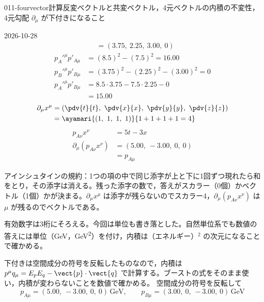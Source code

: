\documentclass[uplatex,dvipdfmx,a4paper,11pt]{jsarticle}
\begin{document}
\begin{mondai}{011-fourvector}{計算}{反変ベクトルと共変ベクトル，4元ベクトルの内積の不変性，4元勾配 $\partial_\mu$ が下付きになること}
\begin{kotaeutsushi}{2026-10-28}
\begin{align*}
  &=(3.75,\ 2.25,\ 3.00,\ 0)
\end{align*}
\begin{align*}
  p_{A}'^{\mu}p'_{A\mu}&=(8.5)^{2}-(7.5)^{2}=16.00\\
  p_{B}'^{\mu}p'_{B\mu}&=(3.75)^{2}-(2.25)^{2}-(3.00)^{2}=0\\
  p_{A}'^{\mu}p'_{B\mu}&=8.5\cdot3.75-7.5\cdot2.25-0\\
  &=15.00
\end{align*}
\begin{align*}
  \partial_{\mu}x^{\mu}&=\left(\pdv{t}{t},\ \pdv{x}{x},\ \pdv{y}{y},\ \pdv{z}{z}\right)\\
  &=\ayamari{(1,\ 1,\ 1,\ 1)}{1+1+1+1=4}
\end{align*}
\begin{align*}
  p_{A\nu}x^{\nu}&=5t-3x\\
  \partial_{\mu}(p_{A\nu}x^{\nu})&=(5.00,\ -3.00,\ 0,\ 0)\\
  &=p_{A\mu}
\end{align*}
\end{kotaeutsushi}
\begin{kizuki}
\item アインシュタインの規約：1つの項の中で同じ添字が上と下に1回ずつ現れたら和をとり，その添字は消える。残った添字の数で，答えがスカラー（0個）かベクトル（1個）かが決まる。$\partial_{\mu}x^{\mu}$ は添字が残らないのでスカラー4，$\partial_{\mu}(p_{A\nu}x^{\nu})$ は $\mu$ が残るのでベクトルである。
\item {} 有効数字は3桁にそろえる。今回は単位も書き落とした。自然単位系でも数値の答えには単位（\unit{\giga\electronvolt}，\unit{\giga\electronvolt\squared}）を付け，内積は（エネルギー）$^{2}$ の次元になることで確かめる。
\end{kizuki}
\begin{tadashii}
\houshin 下付きは空間成分の符号を反転したものなので，内積は $p^\mu q_\mu=E_pE_q-\vect{p}\cdot\vect{q}$ で計算する。ブーストの式をそのまま使い，内積が変わらないことを数値で確かめる。 %
\keisan {} 空間成分の符号を反転して
\[ p_{A\mu}=(5.00,\ -3.00,\ 0,\ 0)\,\unit{\giga\electronvolt},\qquad p_{B\mu}=(3.00,\ 0,\ -3.00,\ 0)\,\unit{\giga\electronvolt} \]

\end{tadashii}
\end{mondai}
\end{document}

